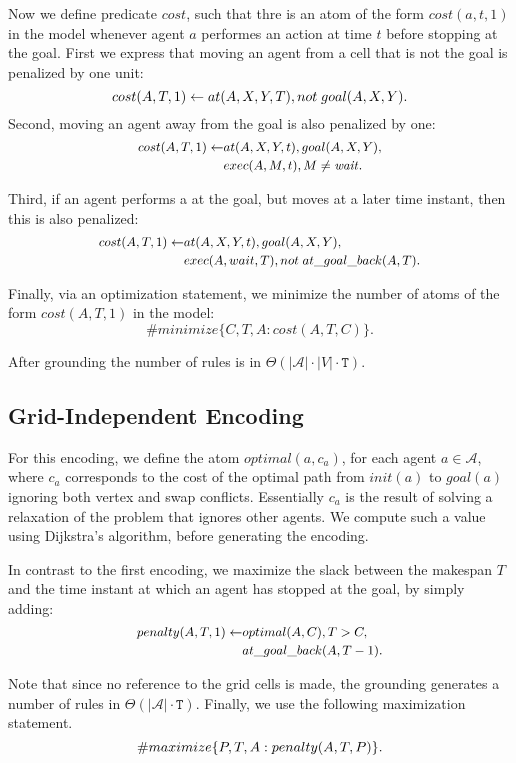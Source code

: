 Now we define predicate $cost$, such that thre is an atom of the form $cost(a,t,1)$ in the model whenever agent $a$ performes an action at time $t$ before stopping at the goal. First we express that moving an agent from a cell that is not the goal is penalized by one unit:
\begin{equation*}\small
cost(A,T,1) \leftarrow at(A,X,Y,T), not \; goal(A,X,Y).
\end{equation*}
Second, moving an agent away from the goal is also penalized by one:
\begin{equation*}\small
  \begin{split}
    cost(A,T,1) \leftarrow &at(A,X,Y,t), goal(A,X,Y), \\
    &exec(A,M,t), M \neq \Wait.
  \end{split}
  \end{equation*}

Third, if an agent performs a \Wait at the goal, but moves at a later time instant, then this is also penalized:
\begin{equation*}\small
  \begin{split}
    cost(A,T,1) \leftarrow &at(A,X,Y,t), goal(A,X,Y), \\
    &exec(A,wait,T), not \; at\_goal\_back(A,T).
  \end{split}
  \end{equation*}


Finally, via an optimization statement, we minimize the number of atoms of the form $cost(A,T,1)$ in the model:
\[ \#minimize \{C,T,A : cost(A,T,C)\}.\]

After grounding the number of rules is in $\Theta(|\mathcal{A}|\cdot|V| \cdot \mathtt{T})$.

\subsection{Grid-Independent Encoding}
For this encoding, we define the atom $optimal(a, c_a)$, for each agent $a\in \mathcal{A}$, where $c_a$ corresponds to the cost of the optimal path from $init(a)$ to $goal(a)$ ignoring both vertex and swap conflicts. Essentially $c_a$ is the result of solving a relaxation of the problem that ignores other agents. We compute such a value using Dijkstra's algorithm, before generating the encoding.

In contrast to the first encoding, we maximize the slack between the makespan $T$ and the time instant at which an agent has stopped at the goal, by simply adding:
\begin{equation*}\small
  \begin{split}
    penalty(A,T,1) \leftarrow &optimal(A,C), T > C, \\
    &at\_goal\_back(A,T-1).
\end{split}
\end{equation*}

Note that since no reference to the grid cells is made, the grounding generates a number of rules in $\Theta(|\mathcal{A}|\cdot\mathtt{T})$. Finally, we use the following maximization statement.
\[ \small \#maximize \{P,T,A : penalty(A,T,P)\}.\]

